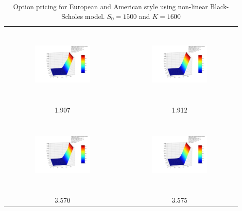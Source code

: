 \documentclass[10pt,a4paper]{article}
\begin{document}
\begin{table}
\begin{tabular}{|c|c|}
		\hline
		\includegraphics[width=0.5\textwidth, height=40mm]{Black-Scholes_K1600.0_sigma0.2_r0.03_beta2e-06_T0.9_nonlinear_european.png}
		& \includegraphics[width=0.5\textwidth, height=40mm]{Black-Scholes_K1600.0_sigma0.2_r0.03_beta2e-06_T0.9_nonlinear_american.png} \\
		1.907 &  1.912\\
		\hline
		\includegraphics[width=0.5\textwidth, height=40mm]{Black-Scholes_K1600.0_sigma0.25_r0.02_beta2e-06_T0.9_nonlinear_european.png}
		& \includegraphics[width=0.5\textwidth, height=40mm]{Black-Scholes_K1600.0_sigma0.25_r0.02_beta2e-06_T0.9_nonlinear_american.png} \\
		3.570 & 3.575 \\ 
		\hline
	\end{tabular}
	\caption{Option pricing for European and American style using  non-linear Black-Scholes model. $S_0=1500$ and $K=1600$}\label{tbl:nonlinear}	
\end{table}
\end{document}
